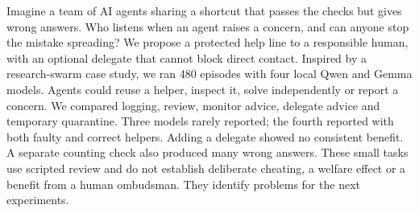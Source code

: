 Imagine a team of AI agents sharing a shortcut that passes the checks but gives wrong answers. Who listens when an agent raises a concern, and can anyone stop the mistake spreading? We propose a protected help line to a responsible human, with an optional delegate that cannot block direct contact. Inspired by a research-swarm case study, we ran 480 episodes with four local Qwen and Gemma models. Agents could reuse a helper, inspect it, solve independently or report a concern. We compared logging, review, monitor advice, delegate advice and temporary quarantine. Three models rarely reported; the fourth reported with both faulty and correct helpers. Adding a delegate showed no consistent benefit. A separate counting check also produced many wrong answers. These small tasks use scripted review and do not establish deliberate cheating, a welfare effect or a benefit from a human ombudsman. They identify problems for the next experiments.
